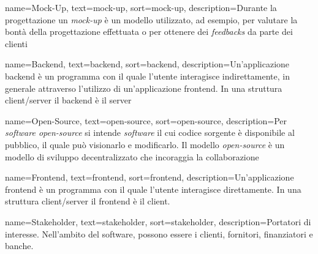 {
    name=Mock-Up,
    text=mock-up,
    sort=mock-up,
    description={Durante la progettazione un \emph{mock-up} è un modello utilizzato, ad esempio, per valutare la bontà della progettazione effettuata o per ottenere dei \emph{feedbacks} da parte dei clienti}
}

{
    name=Backend,
    text=backend,
    sort=backend,
    description={Un'applicazione backend è un programma con il quale l'utente interagisce indirettamente, in generale attraverso l'utilizzo di un'applicazione \gls{frontend}. In una struttura client/server il backend è il server}
}

{
    name=Open-Source,
    text=open-source,
    sort=open-source,
    description={Per \emph{software open-source} si intende \emph{software} il cui codice sorgente è disponibile al pubblico, il quale può visionarlo e modificarlo. Il modello \emph{open-source} è un modello di sviluppo decentralizzato che incoraggia la collaborazione}
}

{
    name=Frontend,
    text=frontend,
    sort=frontend,
    description={Un'applicazione frontend è un programma con il quale l'utente interagisce direttamente. In una struttura client/server il frontend è il client.}
}

{
    name=Stakeholder,
    text=stakeholder,
    sort=stakeholder,
    description={Portatori di interesse. Nell’ambito del software, possono essere i clienti, fornitori, finanziatori e banche.}
}

